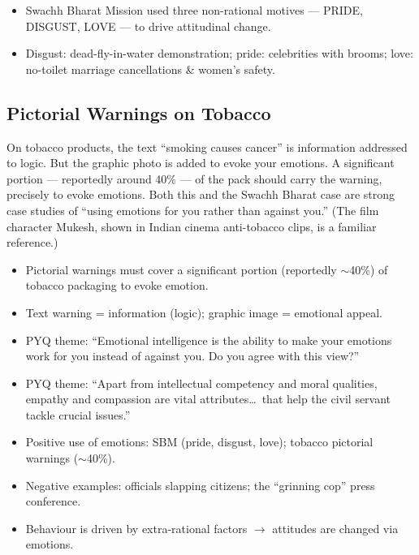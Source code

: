\begin{GovtPolicy}
\begin{itemize}
\item Swachh Bharat Mission used three non-rational motives --- PRIDE, DISGUST, LOVE --- to drive attitudinal change.
\item Disgust: dead-fly-in-water demonstration; pride: celebrities with brooms; love: no-toilet marriage cancellations \& women's safety.
\end{itemize}
\end{GovtPolicy}

\subsection{Pictorial Warnings on Tobacco}

On tobacco products, the text ``smoking causes cancer'' is information addressed to logic. But the graphic photo is added to evoke your emotions. A significant portion --- reportedly around 40\% --- of the pack should carry the warning, precisely to evoke emotions. Both this and the Swachh Bharat case are strong case studies of ``using emotions for you rather than against you.'' (The film character Mukesh, shown in Indian cinema anti-tobacco clips, is a familiar reference.)

\begin{DataFact}
\begin{itemize}
\item Pictorial warnings must cover a significant portion (reportedly $\sim$40\%) of tobacco packaging to evoke emotion.
\item Text warning = information (logic); graphic image = emotional appeal.
\end{itemize}
\end{DataFact}

\begin{PYQLink}
\begin{itemize}
\item PYQ theme: ``Emotional intelligence is the ability to make your emotions work for you instead of against you. Do you agree with this view?''
\item PYQ theme: ``Apart from intellectual competency and moral qualities, empathy and compassion are vital attributes\ldots\ that help the civil servant tackle crucial issues.''
\end{itemize}
\end{PYQLink}

\begin{QuickRevision}
\begin{itemize}
\item Positive use of emotions: SBM (pride, disgust, love); tobacco pictorial warnings ($\sim$40\%).
\item Negative examples: officials slapping citizens; the ``grinning cop'' press conference.
\item Behaviour is driven by extra-rational factors $\rightarrow$ attitudes are changed via emotions.
\end{itemize}
\end{QuickRevision}

